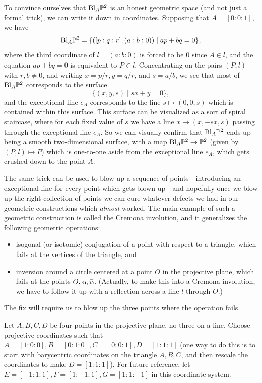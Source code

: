 To convince ourselves that $\text{\rm Bl}_A\mathbb{P}^2$ is an honest geometric space (and not just a formal trick), we can write it down in coordinates. Supposing that $A = [0:0:1]$, we have
\[
\text{\rm Bl}_A\mathbb{P}^2 = \{([p:q:r], (a:b:0)) \mid ap + bq = 0\},
\]
where the third coordinate of $l = (a:b:0)$ is forced to be $0$ since $A \in l$, and the equation $ap + bq = 0$ is equivalent to $P \in l$. Concentrating on the pairs $(P,l)$ with $r, b \ne 0$, and writing $x = p/r, y = q/r$, and $s = a/b$, we see that most of $\text{\rm Bl}_A\mathbb{P}^2$ corresponds to the surface
\[
\{(x,y,s) \mid sx + y = 0\},
\]
and the exceptional line $e_A$ corresponds to the line $s \mapsto (0,0,s)$ which is contained within this surface. This surface can be visualized as a sort of spiral staircase, where for each fixed value of $s$ we have a line $x \mapsto (x,-sx,s)$ passing through the exceptional line $e_A$. So we can visually confirm that $\text{\rm Bl}_A\mathbb{P}^2$ ends up being a smooth two-dimensional surface, with a map $\text{\rm Bl}_A \mathbb{P}^2 \rightarrow \mathbb{P}^2$ (given by $(P,l) \mapsto P$) which is one-to-one aside from the exceptional line $e_A$, which gets crushed down to the point $A$.

The same trick can be used to blow up a sequence of points - introducing an exceptional line for every point which gets blown up - and hopefully once we blow up the right collection of points we can cure whatever defects we had in our geometric constructions which \emph{almost} worked. The main example of such a geometric construction is called the Cremona involution, and it generalizes the following geometric operations:
\begin{itemize}
\item isogonal (or isotomic) conjugation of a point with respect to a triangle, which fails at the vertices of the triangle, and
\item inversion around a circle centered at a point $O$ in the projective plane, which fails at the points $O, \fish, \bar\fish$. (Actually, to make this into a Cremona involution, we have to follow it up with a reflection across a line $l$ through $O$.)
\end{itemize}
The fix will require us to blow up the three points where the operation fails.

Let $A,B,C,D$ be four points in the projective plane, no three on a line. Choose projective coordinates such that $A = [1:0:0], B = [0:1:0], C = [0:0:1], D = [1:1:1]$ (one way to do this is to start with barycentric coordinates on the triangle $A,B,C$, and then rescale the coordinates to make $D = [1:1:1]$). For future reference, let $E = [-1:1:1], F = [1:-1:1], G = [1:1:-1]$ in this coordinate system.

